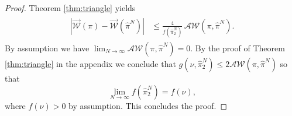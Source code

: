 \documentclass[10pt]{amsart}
\begin{document}
\begin{proof}
Theorem \ref{thm:triangle} yields
\begin{align*}
\begin{split}
\left| \overrightarrow{\mathcal{W}}(\pi)-\overrightarrow{\mathcal{W}}(\hat{\pi}^N) \right|
&\le \frac{4 }{f(\hat{\pi}^N_2)} \, \mathcal{AW}(\pi,\hat{\pi}^N).
\end{split}
\end{align*}
By assumption we have $\lim_{N\to \infty} \mathcal{AW}(\pi,\hat{\pi}^N)=0$. By the proof of Theorem \ref{thm:triangle} in the appendix we conclude that $g(\nu, \hat{\pi}^N_2)\le 2 \mathcal{AW}(\pi,\hat{\pi}^N)$ so that $$\lim_{N\to \infty} f(\hat{\pi}^N_2)=f(\nu),$$ where $f(\nu)>0$ by assumption. This concludes the proof.
\end{proof}
\end{document}
